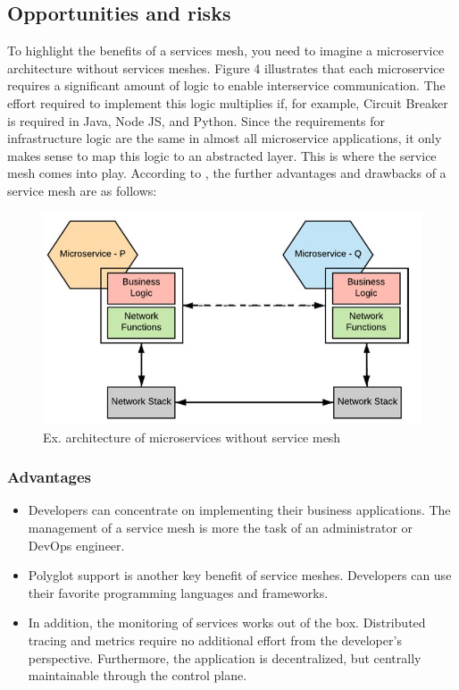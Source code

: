 \subsection{Opportunities and risks}

To highlight the benefits of a services mesh, you need to imagine a microservice architecture without services meshes. Figure 4 illustrates that each microservice requires a significant amount of logic to enable interservice communication. The effort required to implement this logic multiplies if, for example, Circuit Breaker is required in Java, Node JS, and Python. Since the requirements for infrastructure logic are the same in almost all microservice applications, it only makes sense to map this logic to an abstracted layer. This is where the service mesh comes into play. According to \cite{sm4}, the further advantages and drawbacks of a service mesh are as follows:

\begin{figure}
    \includegraphics[width=\columnwidth]{img/microservices_without_mesh.JPG}
    \caption{Ex. architecture of microservices without service mesh\cite[S. 265]{sm4}}
    \label{fig:microservice-without-mesh}
\end{figure}

\subsubsection{Advantages}

\begin{itemize}

    \item Developers can concentrate on implementing their business applications. The management of a service mesh is more the task of an administrator or DevOps engineer.

    \item Polyglot support is another key benefit of service meshes. Developers can use their favorite programming languages and frameworks.

    \item In addition, the monitoring of services works out of the box. Distributed tracing and metrics require no additional effort from the developer's perspective. Furthermore, the application is decentralized, but centrally maintainable through the control plane. 

\end{itemize}
